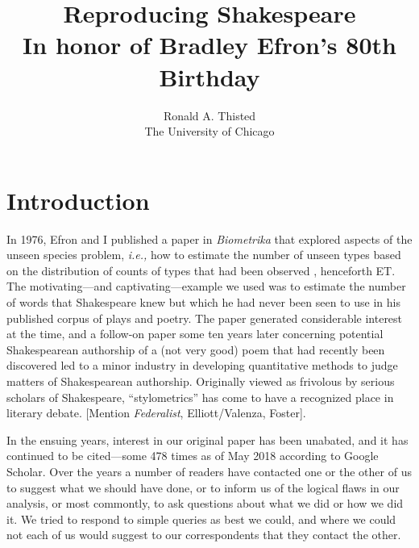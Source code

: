 \documentclass[
  letterpaper, %
  11pt, %
  oneside,  %
  onecolumn,  %
  openany,  %
  article
]{memoir}
\title{Reproducing Shakespeare\\{\large In honor of Bradley Efron's 80th Birthday}}
\author{Ronald A. Thisted\\The University of Chicago}
\begin{document}
\frontmatter

\maketitle

\begin{abstract}
	
\end{abstract}
\clearpage

\tableofcontents*
\clearpage

\mainmatter

\chapter[Introductory Matter]{Introduction}
\epigraphfontsize{\small\itshape}


	In 1976, Efron and I published a paper in \textit{Biometrika} that explored aspects of the unseen species problem, \textit{i.e.,} how to estimate the number of unseen types based on the distribution of counts of types that had been observed \citep{Efron:1976zs}, henceforth ET.  The motivating---and captivating---example we used was to estimate the number of words that Shakespeare knew but which he had never been seen to use in his published corpus of plays and poetry.  The paper generated considerable interest at the time, and a follow-on paper some ten years later concerning potential Shakespearean authorship of a (not very good) poem that had recently been discovered led to a minor industry in developing quantitative methods to judge matters of Shakespearean authorship.  Originally viewed as frivolous by serious scholars of Shakespeare, ``stylometrics'' has come to have a recognized place in literary debate. [Mention \textit{Federalist}, Elliott/Valenza, Foster].
	
	In the ensuing years, interest in our original paper has been unabated, and it has continued to be cited---some 478 times as of May 2018 according to Google Scholar.  Over the years a number of readers have contacted one or the other of us to suggest what we should have done, or to inform us of the logical flaws in our analysis, or most commontly, to ask questions about what we did or how we did it.  We tried to respond to simple queries as best we could, and where we could not each of us would suggest to our correspondents that they contact the other.
	
\end{document}
